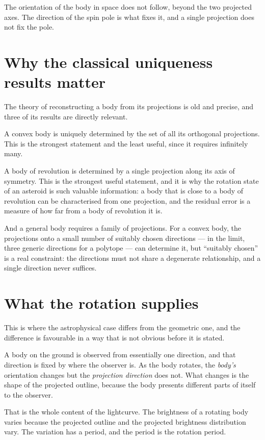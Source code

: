The orientation of the body in space does not follow, beyond the two
projected axes. The direction of the spin pole is what fixes it, and a
single projection does not fix the pole.

\section{Why the classical uniqueness results matter}

The theory of reconstructing a body from its projections is old and precise,
and three of its results are directly relevant.

A convex body is uniquely determined by the set of all its orthogonal
projections. This is the strongest statement and the least useful, since it
requires infinitely many.

A body of revolution is determined by a single projection along its axis of
symmetry. This is the strongest useful statement, and it is why the
rotation state of an asteroid is such valuable information: a body that is
close to a body of revolution can be characterised from one projection, and
the residual error is a measure of how far from a body of revolution it is.

And a general body requires a family of projections. For a convex body, the
projections onto a small number of suitably chosen directions --- in the
limit, three generic directions for a polytope --- can determine it, but
``suitably chosen'' is a real constraint: the directions must not share a
degenerate relationship, and a single direction never suffices.

\section{What the rotation supplies}

This is where the astrophysical case differs from the geometric one, and the
difference is favourable in a way that is not obvious before it is stated.

A body on the ground is observed from essentially one direction, and that
direction is fixed by where the observer is. As the body rotates, the
\emph{body's} orientation changes but the \emph{projection direction} does
not. What changes is the shape of the projected outline, because the body
presents different parts of itself to the observer.

That is the whole content of the lightcurve. The brightness of a rotating
body varies because the projected outline and the projected brightness
distribution vary. The variation has a period, and the period is the
rotation period.

